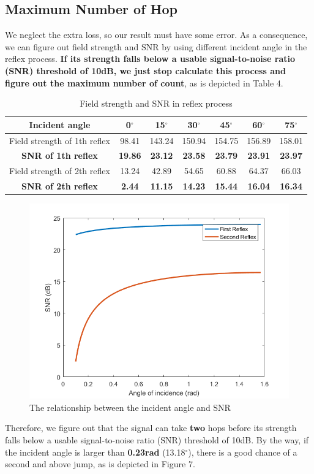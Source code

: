 \documentclass{mcmthesis}
\begin{document}
\subsection{Maximum Number of Hop}
We neglect the extra loss, so our result must have some error. As a consequence, we can figure out field strength and SNR by using different incident angle in the reflex process. \textbf{If its strength falls below a usable signal-to-noise ratio (SNR) threshold of 10dB, we just stop calculate this process and figure out the maximum number of count}, as is depicted in Table 4. 
\newpage
\begin{longtable}{c cccccc}
\caption{Field strength and SNR in reflex process} \\
\toprule
  Incident angle & 0$^\circ$&   15$^\circ$&  30$^\circ$&  45$^\circ$&  60$^\circ$&  75$^\circ$ \\
\midrule 
Field strength of 1th reflex& 98.41 &  143.24 & 150.94 & 154.75 & 156.89 & 158.01  \\
\textbf{SNR of 1th reflex}
& \textbf{19.86} &  \textbf{23.12}  & \textbf{23.58} &  \textbf{23.79} &  \textbf{23.91} & \textbf{23.97}   \\
Field strength of 2th reflex
&13.24&42.89&54.65&60.88&64.37&66.03  \\
\textbf{SNR of 2th reflex}
&\textbf{2.44}&\textbf{11.15} &\textbf{14.23} &\textbf{15.44} &\textbf{16.04} &\textbf{16.34} \\
\bottomrule
\end{longtable}

\begin{figure}[!htbp]
    \centering
    \includegraphics[scale=0.5]{figure/angle_SNR.png}
    \caption{The relationship between the incident angle and SNR}
    \label{fig:myphoto12}
    \end{figure}
Therefore, 
we figure out that the signal can take \textbf{two} hops before its strength falls below a usable signal-to-noise ratio (SNR) threshold of 10dB.
By the way, 
 if the incident angle is larger than \textbf{0.23rad} (13.18$^\circ$), there is a good chance of a second and above jump, as is depicted in Figure 7.
\end{document}
